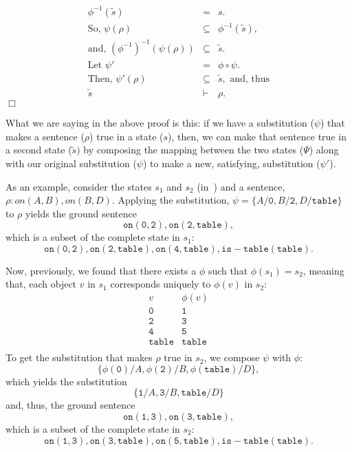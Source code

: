 \begin{eqnarray*}
  \phi^{-1}(\tilde{s})& =& s.  \\
  \textrm{So, } \psi(\rho) &\subseteq& \phi^{-1}(\tilde{s}), \\
  \textrm{and, } (\phi^{-1})^{-1}(\psi(\rho))& \subseteq& \tilde{s}. \\
  \textrm{Let } \psi'& =& \phi \circ \psi.\\
  \textrm{Then, } \psi'(\rho) &\subseteq &\tilde{s}, \textrm{ and, thus} \\
   \tilde{s} &\vdash & \rho.
  \end{eqnarray*}\hfill $\Box$
  
  What we are saying in the above proof is this: if we have a substitution ($\psi$) that makes a sentence ($\rho$) true in a state ($s$), then, we can make that sentence true in a second state ($\tilde{s})$ by composing the mapping between the two states ($\Psi$) along with our original substitution ($\psi$) to make a new, satisfying, substitution ($\psi'$). 
  
  As an example, consider the states $s_1$ and $s_2$ (in~) and a sentence, 
  $ \rho:  on(A,B), on(B,D)$.
  Applying the substitution,
   $ \psi = \{ A / \mathtt{0}, B / \mathtt{2}, D / \mathtt{table} \} $ to $\rho$ 
   yields the ground sentence
   \[ \mathtt{on(0,2), on(2,table)},\]
 which is a subset of the complete state in $s_1$:  
   \[ \mathtt{on(0,2), on(2,table), on(4,table), is-table(table) }.\]
   
 Now, previously, we found that there exists a $\phi$ such that $\phi(s_1) = s_2 $, meaning that, each object $v$ in $s_1$ corresponds uniquely to $\phi(v)$ in $s_2$: 
 \[ \begin{array}{c|c}
     v & \phi(v) \\ \hline
\mathtt{0} &  \mathtt{1}\\ \hline
\mathtt{2} &  \mathtt{3}\\ \hline
\mathtt{4} &  \mathtt{5}\\ \hline
\mathtt{table} &  \mathtt{table}\\ 
\end{array} \]
  To get the substitution that makes $\rho$ true in $s_2$, we compose $\psi$ with $\phi$:
 \[  \{ \phi(\mathtt{0}) / A, \phi(\mathtt{2}) / B, \phi(\mathtt{table}) / D \}, \]
 which yields the substitution 
 \[ \{  \mathtt{1} / A,  \mathtt{3} / B,  \mathtt{table} / D \} \]
 and, thus, the ground sentence 
 \[ \mathtt{on(1,3), on(3,table)},\]
 which is a subset of the complete state in $s_2$:  
   \[ \mathtt{on(1,3), on(3,table), on(5,table), is-table(table) }.\]
 
